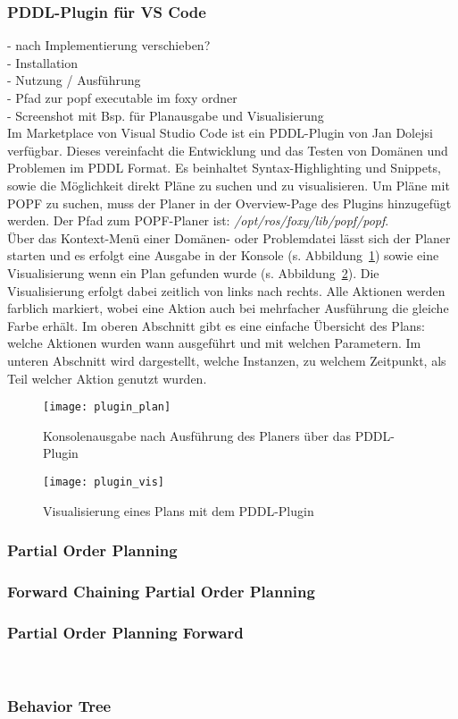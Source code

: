 \subsubsection{PDDL-Plugin für VS Code}
- nach Implementierung verschieben?\\
- Installation\\
- Nutzung / Ausführung\\
- Pfad zur popf executable im foxy ordner\\
- Screenshot mit Bsp. für Planausgabe und Visualisierung\\
Im Marketplace von Visual Studio Code ist ein PDDL-Plugin von Jan Dolejsi verfügbar.
Dieses vereinfacht die Entwicklung und das Testen von Domänen und Problemen im PDDL Format.
Es beinhaltet Syntax-Highlighting und Snippets, sowie die Möglichkeit direkt Pläne zu suchen und zu visualisieren.
Um Pläne mit \ac{POPF} zu suchen, muss der Planer in der Overview-Page des Plugins hinzugefügt werden.
Der Pfad zum \ac{POPF}-Planer ist: \emph{/opt/ros/foxy/lib/popf/popf}.\\
Über das Kontext-Menü einer Domänen- oder Problemdatei lässt sich der Planer starten und es erfolgt eine Ausgabe in der Konsole (s. Abbildung~\ref{fig:pluginplan}) sowie eine Visualisierung wenn ein Plan gefunden wurde (s. Abbildung~\ref{fig:pluginvis}).
Die Visualisierung erfolgt dabei zeitlich von links nach rechts.
Alle Aktionen werden farblich markiert, wobei eine Aktion auch bei mehrfacher Ausführung die gleiche Farbe erhält.
Im oberen Abschnitt gibt es eine einfache Übersicht des Plans: welche Aktionen wurden wann ausgeführt und mit welchen Parametern.
Im unteren Abschnitt wird dargestellt, welche Instanzen, zu welchem Zeitpunkt, als Teil welcher Aktion genutzt wurden.
\begin{figure}[ht!]
    \centering
    \texttt{[image: plugin\_plan]}
    \caption{Konsolenausgabe nach Ausführung des Planers über das PDDL-Plugin}
    \label{fig:pluginplan}
\end{figure}

\begin{figure}[ht!]
    \centering
    \texttt{[image: plugin\_vis]}
    \caption{Visualisierung eines Plans mit dem PDDL-Plugin}
    \label{fig:pluginvis}
\end{figure}
\subsubsection{Partial Order Planning}
\subsubsection{Forward Chaining Partial Order Planning}
\subsubsection{Partial Order Planning Forward}
~\citep{popf}
\subsubsection{Behavior Tree}